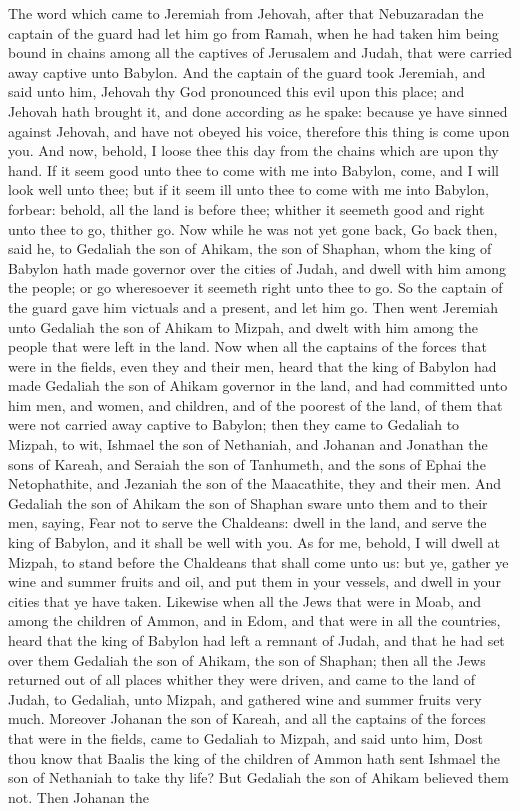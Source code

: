 The word which came to Jeremiah from Jehovah, after that Nebuzaradan the captain of the guard had let him go from Ramah, when he had taken him being bound in chains among all the captives of Jerusalem and Judah, that were carried away captive unto Babylon. And the captain of the guard took Jeremiah, and said unto him, Jehovah thy God pronounced this evil upon this place; and Jehovah hath brought it, and done according as he spake: because ye have sinned against Jehovah, and have not obeyed his voice, therefore this thing is come upon you. And now, behold, I loose thee this day from the chains which are upon thy hand. If it seem good unto thee to come with me into Babylon, come, and I will look well unto thee; but if it seem ill unto thee to come with me into Babylon, forbear: behold, all the land is before thee; whither it seemeth good and right unto thee to go, thither go. Now while he was not yet gone back, Go back then, said he, to Gedaliah the son of Ahikam, the son of Shaphan, whom the king of Babylon hath made governor over the cities of Judah, and dwell with him among the people; or go wheresoever it seemeth right unto thee to go. So the captain of the guard gave him victuals and a present, and let him go. Then went Jeremiah unto Gedaliah the son of Ahikam to Mizpah, and dwelt with him among the people that were left in the land.  Now when all the captains of the forces that were in the fields, even they and their men, heard that the king of Babylon had made Gedaliah the son of Ahikam governor in the land, and had committed unto him men, and women, and children, and of the poorest of the land, of them that were not carried away captive to Babylon; then they came to Gedaliah to Mizpah, to wit, Ishmael the son of Nethaniah, and Johanan and Jonathan the sons of Kareah, and Seraiah the son of Tanhumeth, and the sons of Ephai the Netophathite, and Jezaniah the son of the Maacathite, they and their men. And Gedaliah the son of Ahikam the son of Shaphan sware unto them and to their men, saying, Fear not to serve the Chaldeans: dwell in the land, and serve the king of Babylon, and it shall be well with you. As for me, behold, I will dwell at Mizpah, to stand before the Chaldeans that shall come unto us: but ye, gather ye wine and summer fruits and oil, and put them in your vessels, and dwell in your cities that ye have taken. Likewise when all the Jews that were in Moab, and among the children of Ammon, and in Edom, and that were in all the countries, heard that the king of Babylon had left a remnant of Judah, and that he had set over them Gedaliah the son of Ahikam, the son of Shaphan; then all the Jews returned out of all places whither they were driven, and came to the land of Judah, to Gedaliah, unto Mizpah, and gathered wine and summer fruits very much.  Moreover Johanan the son of Kareah, and all the captains of the forces that were in the fields, came to Gedaliah to Mizpah, and said unto him, Dost thou know that Baalis the king of the children of Ammon hath sent Ishmael the son of Nethaniah to take thy life? But Gedaliah the son of Ahikam believed them not. Then Johanan the 